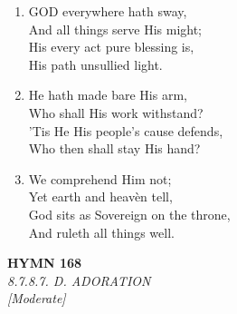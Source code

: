 \begin{enumerate}
    \item GOD everywhere hath sway, \\
        And all things serve His might; \\
        His every act pure blessing is, \\
        His path unsullied light.

    \item He hath made bare His arm, \\
        Who shall His work withstand? \\
        'Tis He His people's cause defends, \\
        Who then shall stay His hand?

    \item We comprehend Him not; \\
        Yet earth and heav\`en tell, \\
        God sits as Sovereign on the throne, \\
        And ruleth all things well.

\end{enumerate}

\newpage
\begin{center}
    {\Large \textbf{HYMN 168}}
    \\
    \textit{8.7.8.7. D. ADORATION}
    \\
    \textit{\small [Moderate]}
\end{center}
\vspace{1em}

